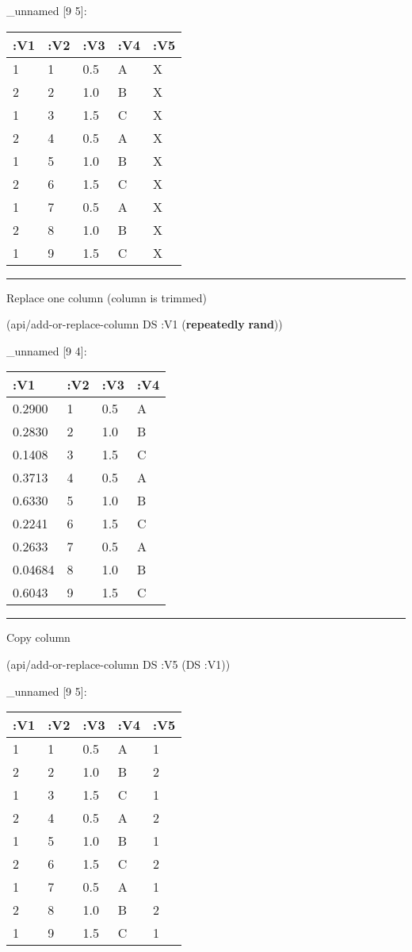\documentclass[]{article}
\newenvironment{Shaded}{\begin{snugshade}}{\end{snugshade}}
\newcommand{\AttributeTok}[1]{\textcolor[rgb]{0.77,0.63,0.00}{#1}}
\newcommand{\KeywordTok}[1]{\textcolor[rgb]{0.13,0.29,0.53}{\textbf{#1}}}
\newcommand{\NormalTok}[1]{#1}
\begin{document}
\_unnamed {[}9 5{]}:

\begin{longtable}[]{@{}lllll@{}}
\toprule
:V1 & :V2 & :V3 & :V4 & :V5\tabularnewline
\midrule
\endhead
1 & 1 & 0.5 & A & X\tabularnewline
2 & 2 & 1.0 & B & X\tabularnewline
1 & 3 & 1.5 & C & X\tabularnewline
2 & 4 & 0.5 & A & X\tabularnewline
1 & 5 & 1.0 & B & X\tabularnewline
2 & 6 & 1.5 & C & X\tabularnewline
1 & 7 & 0.5 & A & X\tabularnewline
2 & 8 & 1.0 & B & X\tabularnewline
1 & 9 & 1.5 & C & X\tabularnewline
\bottomrule
\end{longtable}

\begin{center}\rule{0.5\linewidth}{0.5pt}\end{center}

Replace one column (column is trimmed)

\begin{Shaded}
\begin{Highlighting}[]
\NormalTok{(api/add-or-replace-column DS }\AttributeTok{:V1}\NormalTok{ (}\KeywordTok{repeatedly} \KeywordTok{rand}\NormalTok{))}
\end{Highlighting}
\end{Shaded}

\_unnamed {[}9 4{]}:

\begin{longtable}[]{@{}llll@{}}
\toprule
:V1 & :V2 & :V3 & :V4\tabularnewline
\midrule
\endhead
0.2900 & 1 & 0.5 & A\tabularnewline
0.2830 & 2 & 1.0 & B\tabularnewline
0.1408 & 3 & 1.5 & C\tabularnewline
0.3713 & 4 & 0.5 & A\tabularnewline
0.6330 & 5 & 1.0 & B\tabularnewline
0.2241 & 6 & 1.5 & C\tabularnewline
0.2633 & 7 & 0.5 & A\tabularnewline
0.04684 & 8 & 1.0 & B\tabularnewline
0.6043 & 9 & 1.5 & C\tabularnewline
\bottomrule
\end{longtable}

\begin{center}\rule{0.5\linewidth}{0.5pt}\end{center}

Copy column

\begin{Shaded}
\begin{Highlighting}[]
\NormalTok{(api/add-or-replace-column DS }\AttributeTok{:V5}\NormalTok{ (DS }\AttributeTok{:V1}\NormalTok{))}
\end{Highlighting}
\end{Shaded}

\_unnamed {[}9 5{]}:

\begin{longtable}[]{@{}lllll@{}}
\toprule
:V1 & :V2 & :V3 & :V4 & :V5\tabularnewline
\midrule
\endhead
1 & 1 & 0.5 & A & 1\tabularnewline
2 & 2 & 1.0 & B & 2\tabularnewline
1 & 3 & 1.5 & C & 1\tabularnewline
2 & 4 & 0.5 & A & 2\tabularnewline
1 & 5 & 1.0 & B & 1\tabularnewline
2 & 6 & 1.5 & C & 2\tabularnewline
1 & 7 & 0.5 & A & 1\tabularnewline
2 & 8 & 1.0 & B & 2\tabularnewline
1 & 9 & 1.5 & C & 1\tabularnewline
\bottomrule
\end{longtable}
\end{document}
